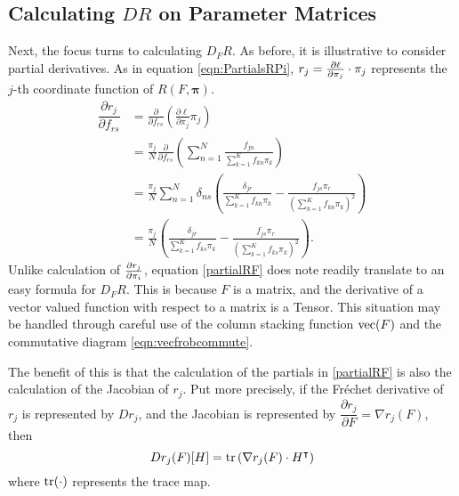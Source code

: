 \subsection{Calculating \( DR \) on Parameter Matrices}

Next, the focus turns to calculating \( D_FR \). As before, it is illustrative to consider partial derivatives. As in equation \eqref{eqn:PartialsRPi}, $r_j = \pdv{\ell}{\pi_j}\cdot\pi_j$ represents the $j$-th coordinate function of $R(F,\bm\pi)$.
\begin{align}
\dfrac{\partial r_j}{\partial f_{rs}}&=\frac{\partial}{\partial f_{rs}}\left(\frac{\partial\ell}{\partial\pi_j}\pi_j\right)\nonumber \\
									 &=\frac{\pi_j}{N}\frac{\partial}{\partial f_{rs}}\left(\sum\limits_{n=1}^N \frac{f_{jn}}{\sum\limits_{k=1}^{K}f_{kn}\pi_k}\right)\nonumber \\
									 &=\frac{\pi_j}{N}\sum_{n=1}^{N}\delta_{ns}\left(\frac{\delta_{jr}}{\sum\limits_{k=1}^{K}f_{kn}\pi_k}-\frac{f_{js}\pi_r}{\left(\sum\limits_{k=1}^{K}f_{kn}\pi_k\right)^2}\right) \nonumber \\
									 &=\frac{\pi_j}{N}\left(\frac{\delta_{jr}}{\sum\limits_{k=1}^{K}f_{ks}\pi_k}-\frac{f_{js}\pi_r}{\left(\sum\limits_{k=1}^{K}f_{ks}\pi_k\right)^2}\right).\label{partialRF}
\end{align}
Unlike calculation of \( \pdv{r_j}{\pi_i} \), equation \eqref{partialRF} does note readily translate to an easy formula for \( D_FR \).  This is because \( F \) is a matrix, and the derivative of a vector valued function with respect to a matrix is a Tensor.  This situation may be handled through careful use of the column stacking function \( \operatorname{vec}(F) \) and the commutative diagram \eqref{eqn:vecfrobcommute}.
  
The benefit of this is that the calculation of the partials in \ref{partialRF} is also the calculation of the Jacobian of $r_j$.  Put more precisely, if the Fr\'{e}chet derivative of \( r_j \) is represented by $Dr_j$, and the Jacobian is represented by $\dfrac{\partial r_j}{\partial F} = \nabla r_j(F)$, then
\begin{equation}\label{eqn:drjdF}
Dr_j(F)[H]=\op{tr}\left(\nabla r_j(F)\cdot H^{\intercal}\right)%
\end{equation}
where $\operatorname{tr}(\cdot)$ represents the trace map.

